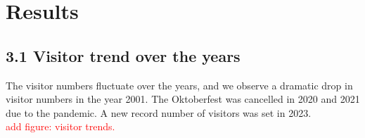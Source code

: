 \documentclass{article}
\theoremstyle{plain}
\theoremstyle{definition}
\theoremstyle{remark}
\begin{document}
% 

\section{Results}\label{sec:results}
\subsection*{3.1 Visitor trend over the years}
The visitor numbers fluctuate over the years, and we observe a dramatic drop in visitor numbers in the year 2001. The Oktoberfest was cancelled in 2020 and 2021 due to the pandemic. A new record number of visitors was set in 2023.\\
\textcolor{red}{add figure: visitor trends.}\\
\end{document}
